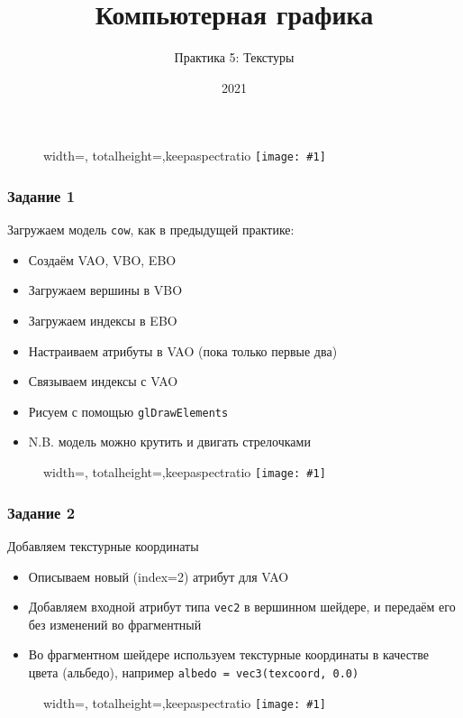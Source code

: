 \documentclass{beamer}
\title{Компьютерная графика}
\subtitle{Практика 5: Текстуры}
\date{2021}
\newcommand{\slideimage}[1]{
  \begin{figure}
    \begin{adjustbox}{width=\textwidth, totalheight=\textheight-2\baselineskip-2\baselineskip,keepaspectratio}
      \texttt{[image: \#1]}
    \end{adjustbox}
  \end{figure}
}
\begin{document}
\frame{\titlepage}

\begin{frame}[fragile]
\slideimage{0.png}
\end{frame}

\begin{frame}[fragile]
\frametitle{Задание 1}
Загружаем модель \verb|cow|, как в предыдущей практике:
\begin{itemize}
\item Создаём VAO, VBO, EBO
\item Загружаем вершины в VBO
\item Загружаем индексы в EBO
\item Настраиваем атрибуты в VAO (пока только первые два)
\item Связываем индексы с VAO
\item Рисуем с помощью \verb|glDrawElements|
\item N.B. модель можно крутить и двигать стрелочками
\end{itemize}
\end{frame}

\begin{frame}[fragile]
\slideimage{1.png}
\end{frame}

\begin{frame}[fragile]
\frametitle{Задание 2}
Добавляем текстурные координаты
\begin{itemize}
\item Описываем новый (index=2) атрибут для VAO
\item Добавляем входной атрибут типа \verb|vec2| в вершинном шейдере, и передаём его без изменений во фрагментный
\item Во фрагментном шейдере используем текстурные координаты в качестве цвета (альбедо), например \verb|albedo = vec3(texcoord, 0.0)|
\end{itemize}
\end{frame}

\begin{frame}[fragile]
\slideimage{2.png}
\end{frame}
\end{document}
